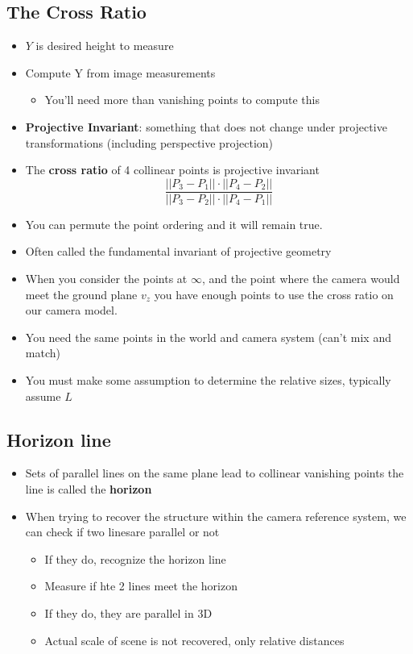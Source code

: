 \subsection{The Cross Ratio}
\begin{itemize}
	\item $Y$ is desired height to measure
	\item Compute Y from image measurements
	\begin{itemize}
		\item You'll need more than vanishing points to compute this
	\end{itemize}
	\item \textbf{Projective Invariant}: something that does not change under projective transformations (including perspective projection)
	\item The \textbf{cross ratio} of 4 collinear points is projective invariant
	$$\frac{||P_3 - P_1||\cdot ||P_4 - P_2||}{||P_3 - P_2||\cdot ||P_4 - P_1||}$$
	\item You can permute the point ordering and it will remain true.
	\item Often called the fundamental invariant of projective geometry
	\item When you consider the points at $\infty$, and the point where the camera would meet the ground plane $v_z$ you have enough points to use the cross ratio on our camera model.
	\item You need the same points in the world and camera system (can't mix and match)
	\item You must make some assumption to determine the relative sizes, typically assume $L$
\end{itemize}

\subsection{Horizon line}
\begin{itemize}
	\item Sets of parallel lines on the same plane lead to collinear vanishing points the line is called the \textbf{horizon}
	\item When trying to recover the structure within the camera reference system, we can check if two linesare parallel or not
	\begin{itemize}
		\item If they do, recognize the horizon line
		\item Measure if hte 2 lines meet the horizon
		\item If they do, they are parallel in 3D
		\item Actual scale of scene is not recovered, only relative distances
	\end{itemize}
\end{itemize}


